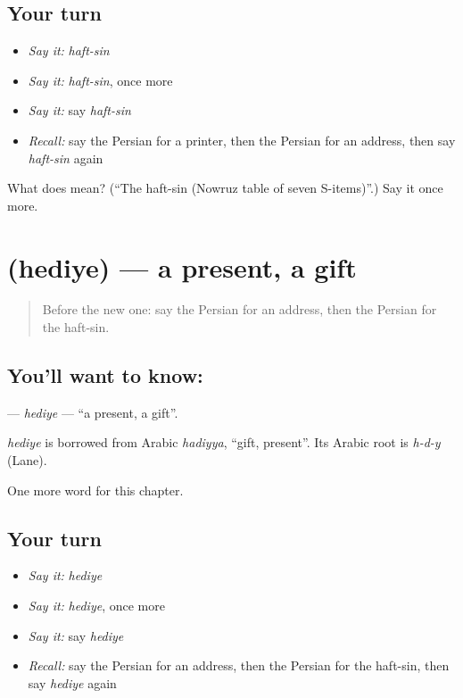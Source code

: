 \subsection*{Your turn}
\begin{itemize}
\raggedright
  \item \emph{Say it:} \emph{haft-sin}
  \item \emph{Say it:} \emph{haft-sin}, once more
  \item \emph{Say it:} say \emph{haft-sin}
  \item \emph{Recall:} say the Persian for a printer, then the Persian for an address, then say \emph{haft-sin} again
\end{itemize}

\begin{tcolorbox}[breakable,colback=teal!4,colframe=teal!35!black,title={Before you move on}]
What does   mean? (\textquotedblleft{}The haft-sin (Nowruz table of seven S-items)\textquotedblright{}.) Say it once more.
\end{tcolorbox}
\section[\texorpdfstring{\fa{هدیه} (hediye)}{هدیه (hediye)}]{ (hediye) — a present, a gift}

\label{lesson:FA-C207-hediye}



\begin{quote}
Before the new one: say the Persian for an address, then the Persian for the haft-sin.
\end{quote}

\subsection*{You'll want to know: }
\textbf{} — \emph{hediye} — \textquotedblleft{}a present, a gift\textquotedblright{}.

\begin{cousinweb}
\emph{hediye} is borrowed from Arabic \emph{hadiyya}, \textquotedblleft{}gift, present\textquotedblright{}. Its Arabic root is \emph{h-d-y} (Lane).
\end{cousinweb}

\begin{grammarlens}[title={What you've built}]
One more word for this chapter.
\end{grammarlens}

\subsection*{Your turn}
\begin{itemize}
\raggedright
  \item \emph{Say it:} \emph{hediye}
  \item \emph{Say it:} \emph{hediye}, once more
  \item \emph{Say it:} say \emph{hediye}
  \item \emph{Recall:} say the Persian for an address, then the Persian for the haft-sin, then say \emph{hediye} again
\end{itemize}

